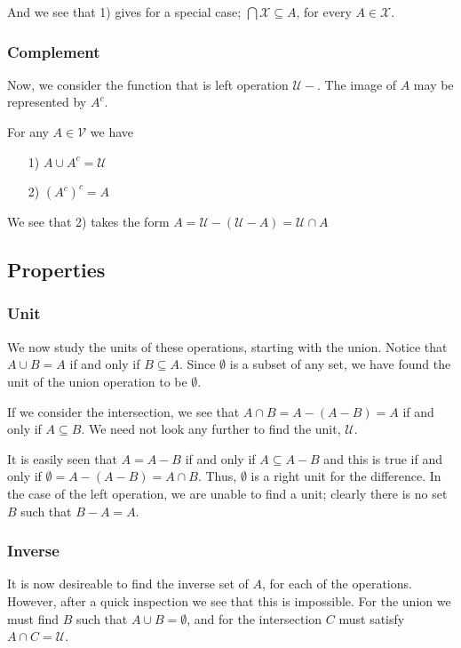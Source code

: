 \documentclass [12pt]{book}
\begin{document}
And we see that 1) gives for a special case; $\bigcap\mathcal{X}\subseteq A$, for every $A\in\mathcal{X}$.


		\subsubsection{Complement} 

Now, we consider the function that is left operation $\mathcal{U}-$. The image of $A$ may be represented by $A^c$.

\begin{proposition}For any $A\in\mathcal{V}$ we have\begin{itemize}\item[1)]$A\cup A^c=\mathcal{U}$\item[2)]$(A^c)^c=A$\end{itemize}\end{proposition}

We see that 2) takes the form $A=\mathcal{U}-(\mathcal{U}-A)=\mathcal{U}\cap A$

		\subsection{Properties}

			\subsubsection{Unit}

We now study the units of these operations, starting with the union. Notice that $A\cup B=A$ if and only if $B\subseteq A$. Since $\emptyset$ is a subset of any set, we have found the unit of the union operation to be $\emptyset$.

If we consider the intersection, we see that $A\cap B=A-(A-B)=A$ if and only if $A\subseteq B$. We need not look any further to find the unit, $\mathcal{U}$.

It is easily seen that $A=A-B$ if and only if $A\subseteq A-B$ and this is true if and only if $\emptyset=A-(A-B)=A\cap B$. Thus, $\emptyset$ is a right unit for the difference. In the case of the left operation, we are unable to find a unit; clearly there is no set $B$ such that $B-A=A$.

		\subsubsection{Inverse} 

It is now desireable to find the inverse set of $A$, for each of the operations. However, after a quick inspection we see that this is impossible. For the union we must find $B$ such that $A\cup B=\emptyset$, and for the intersection $C$ must satisfy $A\cap C=\mathcal{U}$. 
\end{document}
